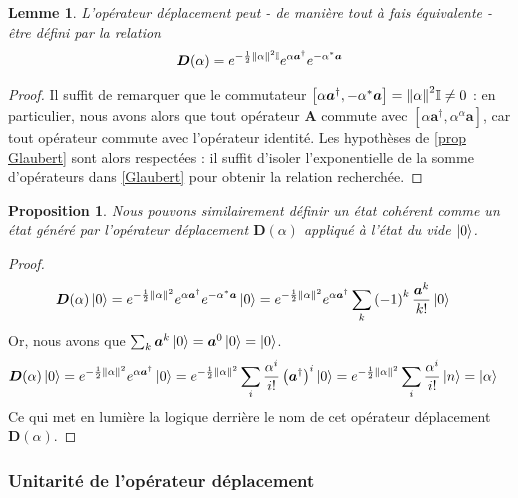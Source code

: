 \documentclass[11pt,oneside,a4paper]{article}
\newtheorem{lemma}[theorem]{Lemme}
\newtheorem{property}[theorem]{Proposition}
\begin{document}
\begin{lemma}
  \label{lemme displacement}
  L'opérateur déplacement peut - de manière tout à fais équivalente - être défini par la relation
  \begin{align}
    \bm{D}(\alpha) = e^{-\frac{1}{2}\norm{\alpha}^2\mathbb{I}}e^{\alpha\bm{a}^\dagger}e^{-\alpha^*\bm{a}}
  \end{align}
\end{lemma}
\begin{proof}
  Il suffit de remarquer que le commutateur $\left[\alpha\bm{a}^\dagger,-\alpha^*\bm{a}\right] = \norm{\alpha}^2\mathbb{I} \neq 0$ : en particulier, nous avons alors que tout opérateur $\bm{A}$ commute avec $\left[\alpha\bm{a}^\dagger,\alpha^\alpha\bm{a}\right]$, car tout opérateur commute avec l'opérateur identité. Les hypothèses de \ref{prop Glaubert} sont alors respectées : il suffit d'isoler l'exponentielle de la somme d'opérateurs dans \eqref{Glaubert} pour obtenir la relation recherchée.
\end{proof}

\begin{property}
  Nous pouvons similairement définir un état cohérent comme un état généré par l'opérateur déplacement $\bm{D}(\alpha)$ appliqué à l'état du vide $\ket{0}$.
\end{property}
\begin{proof}
  \begin{align}
    \bm{D}(\alpha)\ket{0} &=  e^{-\frac{1}{2}\norm{\alpha}^2}e^{\alpha\bm{a}^\dagger}e^{-\alpha^*\bm{a}}\ket{0} = e^{-\frac{1}{2}\norm{\alpha}^2}e^{\alpha\bm{a}^\dagger} \sum_k \left(-1\right)^k \frac{\bm{a}^k}{k!}\ket{0}
  \end{align}
  Or, nous avons que $\sum_k \bm{a}^k\ket{0} = \bm{a}^0\ket{0} = \ket{0}$.
  \begin{align}
    \bm{D}(\alpha)\ket{0} &= e^{-\frac{1}{2}\norm{\alpha}^2}e^{\alpha\bm{a}^\dagger}\ket{0} =  e^{-\frac{1}{2}\norm{\alpha}^2} \sum_i \frac{\alpha^i}{i!}\left(\bm{a}^\dagger\right)^i\ket{0} = e^{-\frac{1}{2}\norm{\alpha}^2} \sum_i \frac{\alpha^i}{i!}\ket{n} = \ket{\alpha}
  \end{align}
  Ce qui met en lumière la logique derrière le nom de cet opérateur déplacement $\bm{D}(\alpha)$.
\end{proof}

\subsubsection{Unitarité de l'opérateur déplacement}
\end{document}
